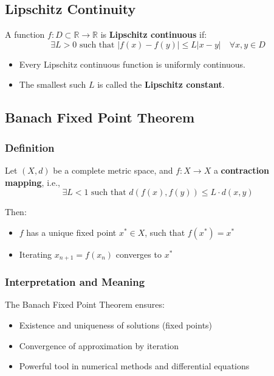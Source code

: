 \subsection{Lipschitz Continuity}

A function \(f: D \subset \mathbb{R} \to \mathbb{R}\) is \textbf{Lipschitz continuous} if:
\[
\exists L > 0 \text{ such that } |f(x) - f(y)| \le L |x - y| \quad \forall x, y \in D
\]

\begin{itemize}[label=\(-\)]
\item Every Lipschitz continuous function is uniformly continuous.
\item The smallest such \(L\) is called the \textbf{Lipschitz constant}.
\end{itemize}

\subsection{Banach Fixed Point Theorem}

\subsubsection*{Definition}

Let \((X, d)\) be a complete metric space, and \(f: X \to X\) a \textbf{contraction mapping}, i.e.,
\[
\exists L < 1 \text{ such that } d(f(x), f(y)) \le L \cdot d(x, y)
\]

Then:
\begin{itemize}[label=\(-\)]
\item \(f\) has a unique fixed point \(x^* \in X\), such that \(f(x^*) = x^*\)
\item Iterating \(x_{n+1} = f(x_n)\) converges to \(x^*\)
\end{itemize}

\subsubsection*{Interpretation and Meaning}

The Banach Fixed Point Theorem ensures:
\begin{itemize}[label=\(-\)]
\item Existence and uniqueness of solutions (fixed points)
\item Convergence of approximation by iteration
\item Powerful tool in numerical methods and differential equations
\end{itemize}

